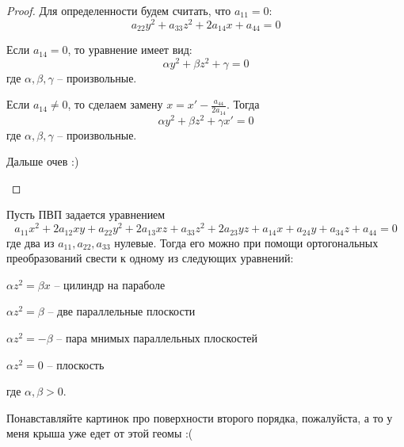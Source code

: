 \begin{proof}
	Для определенности будем считать, что $a_{11} = 0$:
	\[a_{22} y^2 + a_{33} z^2 + 2a_{14} x + a_{44} = 0\]
	\begin{MyItemize}
		\item Если $a_{14} = 0$, то уравнение имеет вид:
		\[\alpha y^2 + \beta z^2 + \gamma = 0\]
		где $\alpha, \beta, \gamma$ -- произвольные.

		\item Если $a_{14} \neq 0$, то сделаем замену $x = x' - \frac{a_{44}}{2a_{14}}$. Тогда 
		\[\alpha y^2 + \beta z^2 + \gamma x' = 0 \]
		где $\alpha, \beta, \gamma$ -- произвольные.

		Дальше очев :)
	\end{MyItemize}
\end{proof}

\begin{Thm}
	Пусть ПВП задается уравнением
	\[a_{11} x^2 + 2a_{12} xy + a_{22} y^2 + 2a_{13} xz + a_{33} z^2 + 2a_{23} yz + a_{14} x + a_{24} y + a_{34} z + a_{44} = 0\]
	где два из $a_{11}, a_{22}, a_{33}$ нулевые. Тогда его можно при помощи ортогональных преобразований свести к одному из следующих уравнений:

	\begin{MyList}
		\item $\alpha z^2 = \beta x$ -- цилиндр на параболе
		\item $\alpha z^2 = \beta$ -- две параллельные плоскости
		\item $\alpha z^2 = -\beta$ -- пара мнимых параллельных плоскостей
		\item $\alpha z^2 = 0$ -- плоскость
	\end{MyList}
	где $\alpha, \beta > 0$.
\end{Thm}

\begin{Rem}
	Понавставляйте картинок про поверхности второго порядка, пожалуйста, а то у меня крыша уже едет от этой геомы :(
\end{Rem}

